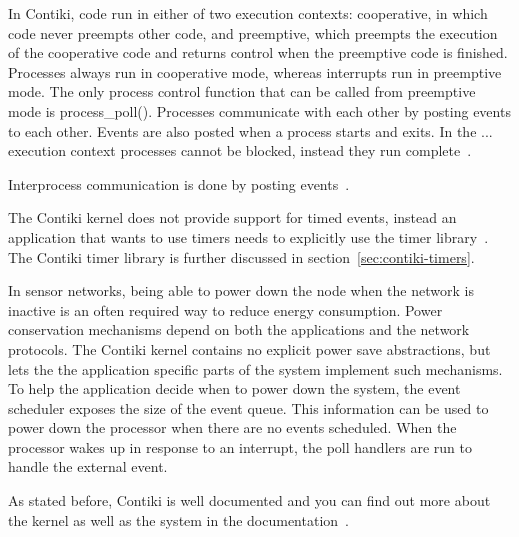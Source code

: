 In Contiki, code run in either of two execution contexts:
cooperative, in which code never preempts other code, and preemptive,
which preempts the execution of the cooperative code and returns control
when the preemptive code is finished.
Processes always run in cooperative mode, whereas interrupts run in preemptive mode.
The only process control function that can be called from preemptive mode is process\_poll(). 
Processes communicate with each other by posting events to each other.
Events are also posted when a process starts and exits.
In the ... execution context processes cannot be blocked,
instead they run complete~\cite{video, paper-contiki}.

Interprocess communication is done by posting events~\cite{paper-contiki}.

The Contiki kernel does not provide support for timed events,
instead an application that wants to use timers needs to explicitly use the timer library~\cite{contiki-docs}.
The Contiki timer library is further discussed in section~\ref{sec:contiki-timers}.

In sensor networks, being able to power down the node
when the network is inactive is an often required way to reduce energy consumption.
Power conservation mechanisms
depend on both the applications and the network protocols.
The Contiki kernel contains no explicit power
save abstractions, but lets the the application specific parts
of the system implement such mechanisms.
To help the application decide when to power down the system, the event
scheduler exposes the size of the event queue.
This information can be used to power down the processor when there
are no events scheduled. When the processor wakes up in
response to an interrupt, the poll handlers are run to handle the external event.

As stated before, Contiki is well documented and you can find out more about
the kernel as well as the system in the documentation~\cite{contiki-docs}.
